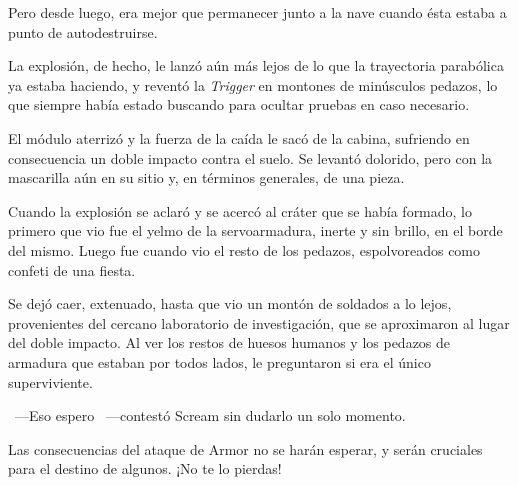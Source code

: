Pero desde luego, era mejor que permanecer junto a la nave cuando ésta estaba a punto de autodestruirse.

La explosión, de hecho, le lanzó aún más lejos de lo que la trayectoria parabólica ya estaba haciendo, y reventó la \emph{Trigger} en montones de minúsculos pedazos, lo que siempre había estado buscando para ocultar pruebas en caso necesario.

El módulo aterrizó y la fuerza de la caída le sacó de la cabina, sufriendo en consecuencia un doble impacto contra el suelo. Se levantó dolorido, pero con la mascarilla aún en su sitio y, en términos generales, de una pieza.

Cuando la explosión se aclaró y se acercó al cráter que se había formado, lo primero que vio fue el yelmo de la servoarmadura, inerte y sin brillo, en el borde del mismo. Luego fue cuando vio el resto de los pedazos, espolvoreados como confeti de una fiesta.

Se dejó caer, extenuado, hasta que vio un montón de soldados a lo lejos, provenientes del cercano laboratorio de investigación, que se aproximaron al lugar del doble impacto. Al ver los restos de huesos humanos y los pedazos de armadura que estaban por todos lados, le preguntaron si era el único superviviente.

~---Eso espero ~---contestó Scream sin dudarlo un solo momento.

\begin{next}
    Las consecuencias del ataque de Armor no se harán esperar, y serán cruciales para el destino de algunos. ¡No te lo pierdas!
\end{next}

\endinput
